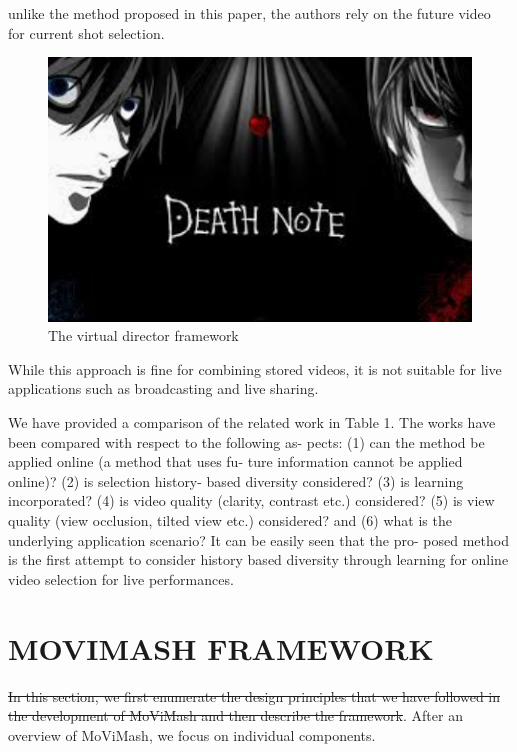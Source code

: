\documentclass{sig-alternate-05-2015}
\providecommand{\DIFadd}[1]{{\protect\color{blue}\uwave{#1}}} %
\providecommand{\DIFdel}[1]{{\protect\color{red}\sout{#1}}}                      %
\providecommand{\DIFaddbegin}{} %
\providecommand{\DIFaddend}{} %
\providecommand{\DIFdelbegin}{} %
\providecommand{\DIFdelend}{} %
\begin{document}
unlike the method proposed in this paper, the authors rely on the
future video for current shot selection. 
\begin{figure}
\centering
\includegraphics{note.pdf}
\caption{The virtual director framework}
\end{figure}
While this approach is fine for combining stored videos, it is not suitable for live applications
such as broadcasting and live sharing.\par
We have provided a comparison of the related work in Table 1.
The works have been compared with respect to the following as-
pects: (1) can the method be applied online (a method that uses fu-
ture information cannot be applied online)? (2) is selection history-
based diversity considered? (3) is learning incorporated? (4) is
video quality (clarity, contrast etc.) considered? (5) is view quality
(view occlusion, tilted view etc.) considered? and (6) what is the
underlying application scenario? It can be easily seen that the pro-
posed method is the first attempt to consider history based diversity
through learning for online video selection for live performances.

\section{MOVIMASH FRAMEWORK}
\DIFdelbegin \DIFdel{In this section, we first enumerate the design principles that we
have followed in the development of MoViMash and then describe
the framework}\DIFdelend \DIFaddbegin \DIFadd{i am the one who knocks}\DIFaddend . After an overview of MoViMash, we focus on individual components.
\end{document}
